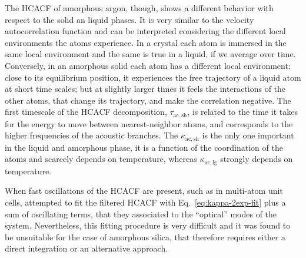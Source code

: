 \begin{LEtext}
The HCACF of amorphous argon, though, shows a different behavior with respect to the solid an liquid phases. It is very similar to the velocity autocorrelation function and can be interpreted considering the different local environments the atoms experience. In a crystal each atom is immersed in the same local environment and the same is true in a liquid, if we average over time. Conversely, in an amorphous solid each atom has a different local environment: close to its equilibrium position, it experiences the free trajectory of a liquid atom at short time scales; but at slightly larger times it feels the interactions of the other atoms, that change its trajectory, and make the correlation negative. 
The first timescale of the HCACF decomposition, $\tau_{\mathrm{ac,sh}}$, is related to the time it takes for the energy to move between nearest-neighbor atoms, and corresponds to the higher frequencies of the acoustic branches. The $\kappa_{\mathrm{ac,sh}}$ is the only one important in the liquid and amorphous phase, it is a function of the coordination of the atoms and scarcely depends on temperature, whereas $\kappa_{\mathrm{ac,lg}}$ strongly depends on temperature.

When fast oscillations of the HCACF are present, such as in multi-atom unit cells, \citet{McGaughey2004b} attempted to fit the filtered HCACF with Eq.~\eqref{eq:kappa-2exp-fit} plus a sum of oscillating terms, that they associated to the ``optical'' modes of the system. 
Nevertheless, this fitting procedure is very difficult and it was found to be unsuitable for the case of amorphous silica, that therefore requires either a direct integration or an alternative approach.



\end{LEtext}
